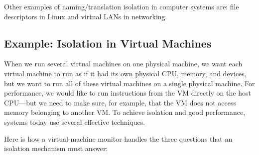 Other examples of naming/translation isolation in computer
systems are: file descriptors in Linux 
and virtual LANs in networking.

\subsection{Example: Isolation in Virtual Machines}
When we run several virtual machines on one
physical machine, we want each virtual machine to run as if
it had its own physical CPU, memory, and devices, but we
want to run all of these virtual machines on a single
physical machine.
For performance, we
would like to run instructions from the VM
directly on the host CPU---but we need to make
sure, for example, that the VM does not access
memory belonging to another VM. To achieve
isolation and good performance, systems today use
several effective techniques.

Here is how a virtual-machine monitor handles the three questions that 
an isolation mechanism must answer:

